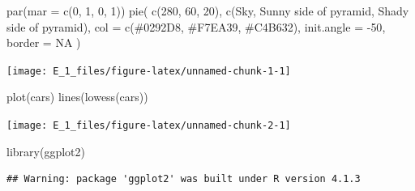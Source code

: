 \documentclass[
  11pt,
]{krantz}
\newenvironment{Shaded}{\begin{snugshade}}{\end{snugshade}}
\newcommand{\AttributeTok}[1]{\textcolor[rgb]{0.77,0.63,0.00}{#1}}
\newcommand{\ConstantTok}[1]{\textcolor[rgb]{0.00,0.00,0.00}{#1}}
\newcommand{\DecValTok}[1]{\textcolor[rgb]{0.00,0.00,0.81}{#1}}
\newcommand{\FunctionTok}[1]{\textcolor[rgb]{0.00,0.00,0.00}{#1}}
\newcommand{\NormalTok}[1]{#1}
\newcommand{\SpecialCharTok}[1]{\textcolor[rgb]{0.00,0.00,0.00}{#1}}
\newcommand{\StringTok}[1]{\textcolor[rgb]{0.31,0.60,0.02}{#1}}
\theoremstyle{definition}
\theoremstyle{definition}
\theoremstyle{definition}
\theoremstyle{definition}
\theoremstyle{remark}
\begin{document}
\begin{Shaded}
\begin{Highlighting}[]
\FunctionTok{par}\NormalTok{(}\AttributeTok{mar =} \FunctionTok{c}\NormalTok{(}\DecValTok{0}\NormalTok{, }\DecValTok{1}\NormalTok{, }\DecValTok{0}\NormalTok{, }\DecValTok{1}\NormalTok{))}
\FunctionTok{pie}\NormalTok{(}
  \FunctionTok{c}\NormalTok{(}\DecValTok{280}\NormalTok{, }\DecValTok{60}\NormalTok{, }\DecValTok{20}\NormalTok{),}
  \FunctionTok{c}\NormalTok{(}\StringTok{\textquotesingle{}Sky\textquotesingle{}}\NormalTok{, }\StringTok{\textquotesingle{}Sunny side of pyramid\textquotesingle{}}\NormalTok{, }\StringTok{\textquotesingle{}Shady side of pyramid\textquotesingle{}}\NormalTok{),}
  \AttributeTok{col =} \FunctionTok{c}\NormalTok{(}\StringTok{\textquotesingle{}\#0292D8\textquotesingle{}}\NormalTok{, }\StringTok{\textquotesingle{}\#F7EA39\textquotesingle{}}\NormalTok{, }\StringTok{\textquotesingle{}\#C4B632\textquotesingle{}}\NormalTok{),}
  \AttributeTok{init.angle =} \SpecialCharTok{{-}}\DecValTok{50}\NormalTok{, }\AttributeTok{border =} \ConstantTok{NA}
\NormalTok{)}
\end{Highlighting}
\end{Shaded}

\begin{center}\texttt{[image: E\_1\_files/figure-latex/unnamed-chunk-1-1]} \end{center}

\begin{Shaded}
\begin{Highlighting}[]
\FunctionTok{plot}\NormalTok{(cars)}
\FunctionTok{lines}\NormalTok{(}\FunctionTok{lowess}\NormalTok{(cars))}
\end{Highlighting}
\end{Shaded}

\begin{center}\texttt{[image: E\_1\_files/figure-latex/unnamed-chunk-2-1]} \end{center}

\begin{Shaded}
\begin{Highlighting}[]
\FunctionTok{library}\NormalTok{(ggplot2)}
\end{Highlighting}
\end{Shaded}

\begin{verbatim}
## Warning: package 'ggplot2' was built under R version 4.1.3
\end{verbatim}
\end{document}
